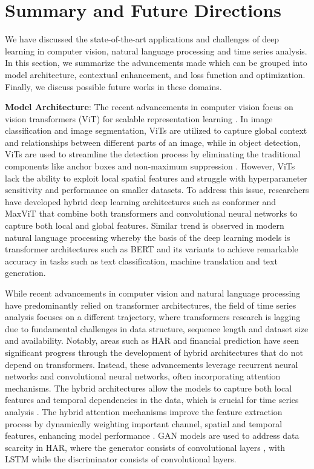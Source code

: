 \documentclass[preprint,12pt]{elsarticle}
\begin{document}
\section{Summary and Future Directions}\label{sec6}
We have discussed the state-of-the-art applications and challenges of deep learning in computer vision, natural language processing and time series analysis. In this section, we summarize the advancements made which can be grouped into model architecture, contextual enhancement, and loss function and optimization. Finally, we discuss possible future works in these domains.

\textbf{Model Architecture}: The recent advancements in computer vision focus on vision transformers (ViT) for scalable representation learning \citep{dosovitskiy_image_2021}. In image classification and image segmentation, ViTs are utilized to capture global context and relationships between different parts of an image, while in object detection, ViTs are used to streamline the detection process by eliminating the traditional components like anchor boxes and non-maximum suppression \citep{carion_end_end_2020}. However, ViTs lack the ability to exploit local spatial features and struggle with hyperparameter sensitivity and performance on smaller datasets. To address this issue, researchers have developed hybrid deep learning architectures such as conformer \citep{peng_conformer_2023} and MaxViT \citep{tu_maxvit_2022} that combine both transformers and convolutional neural networks to capture both local and global features. Similar trend is observed in modern natural language processing whereby the basis of the deep learning models is transformer architectures such as BERT \citep{devlin_bert_2018} and its variants to achieve remarkable accuracy in tasks such as text classification, machine translation and text generation.

While recent advancements in computer vision and natural language processing have predominantly relied on transformer architectures, the field of time series analysis focuses on a different trajectory, where transformers research is lagging due to fundamental challenges in data structure, sequence length and dataset size and availability. Notably, areas such as HAR and financial prediction have seen significant progress through the development of hybrid architectures that do not depend on transformers. Instead, these advancements leverage recurrent neural networks and convolutional neural networks, often incorporating attention mechanisms. The hybrid architectures allow the models to capture both local features and temporal dependencies in the data, which is crucial for time series analysis \citep{khan_attention_2021, ige_deep_2023}. The hybrid attention mechanisms improve the feature extraction process by dynamically weighting important channel, spatial and temporal features, enhancing model performance \citep{gao_danhar_2021, agac_resource-efficient_2024, tang_triple_2022}. GAN models are used to address data scarcity in HAR, where the generator consists of convolutional layers \citep{lupion_data_2024, kia_human_2024}, with LSTM \citep{chan_unified_2021} while the discriminator consists of convolutional layers.
\end{document}
